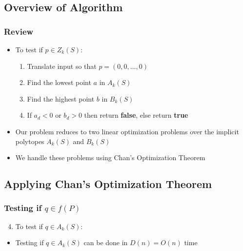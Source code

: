 \documentclass{beamer}
\begin{document}
{\subsection{Overview of Algorithm}
\frame
{
     \frametitle{Review}
     \begin{itemize}
     \item<1-> To test if $p\in Z_k(S)$:
     \begin{enumerate}
      \item<2-> Translate input so that $p=(0,0,\ldots,0)$
      \item<3-> Find the lowest point $a$ in $A_k(S)$
      \item<4-> Find the highest point $b$ in $B_k(S)$
      \item<5-> If $a_d < 0$ or $b_d >0$
	then return \textbf{false}, else return \textbf{true}
     \end{enumerate}
     \item<6->Our problem reduces to two linear optimization problems over
	the implicit polytopes $A_k(S)$ and $B_k(S)$ 
     \item<7->We handle these problems using Chan's Optimization Theorem
    \end{itemize} 
}

\subsection{Applying Chan's Optimization Theorem}


\frame
{
     \frametitle{Testing if $q\in f(P)$}

     \begin{enumerate}
	\setcounter{enumi}{3}
     \item To test if $q\in A_k(S)$:
     \begin{center}
     \end{center}
     \end{enumerate}
     \begin{itemize}
     \item<6->{Testing if $q\in A_k(S)$ can be done in
	$D(n)=O(n)$ time}
     \end{itemize}
} 


}
\end{document}
